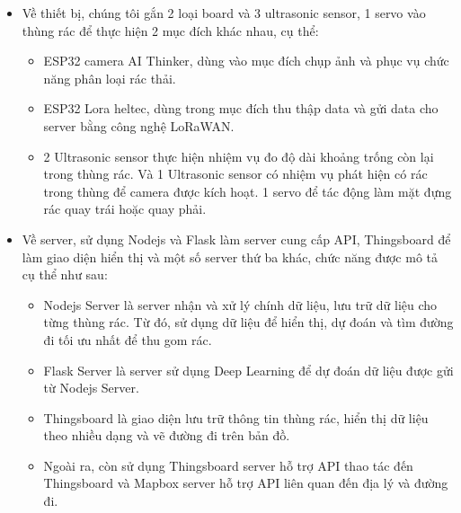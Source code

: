 \begin{itemize}
    \item Về thiết bị, chúng tôi gắn 2 loại board và 3 ultrasonic sensor, 1 servo vào thùng rác để thực hiện 2 mục đích khác nhau, cụ thể:
        \begin{itemize}
            \item ESP32 camera AI Thinker, dùng vào mục đích chụp ảnh và phục vụ chức năng phân loại rác thải.
            \item  ESP32 Lora heltec, dùng trong mục đích thu thập data và gửi data cho server bằng công nghệ LoRaWAN.
            \item 2 Ultrasonic sensor thực hiện nhiệm vụ đo độ dài khoảng trống còn lại trong thùng rác. Và 1 Ultrasonic sensor có nhiệm vụ phát hiện có rác trong thùng để camera được kích hoạt. 1 servo để tác động làm mặt đựng rác quay trái hoặc quay phải.
        \end{itemize}

    \item Về server, sử dụng Nodejs và Flask làm server cung cấp API, Thingsboard để làm giao diện hiển thị và một số server thứ ba khác, chức năng được mô tả cụ thể như sau:
        \begin{itemize}
            \item Nodejs Server là server nhận và xử lý chính dữ liệu, lưu trữ dữ liệu cho từng thùng rác. Từ đó, sử dụng dữ liệu để hiển thị, dự đoán và tìm đường đi tối ưu nhất để thu gom rác.
            \item Flask Server là server sử dụng Deep Learning để dự đoán dữ liệu được gửi từ Nodejs Server.
            \item Thingsboard là giao diện lưu trữ thông tin thùng rác, hiển thị dữ liệu theo nhiều dạng và vẽ đường đi trên bản đồ.
            \item Ngoài ra, còn sử dụng Thingsboard server hỗ trợ API thao tác đến Thingsboard và Mapbox server hỗ trợ API liên quan đến địa lý và đường đi.
        \end{itemize}
   

\end{itemize}


